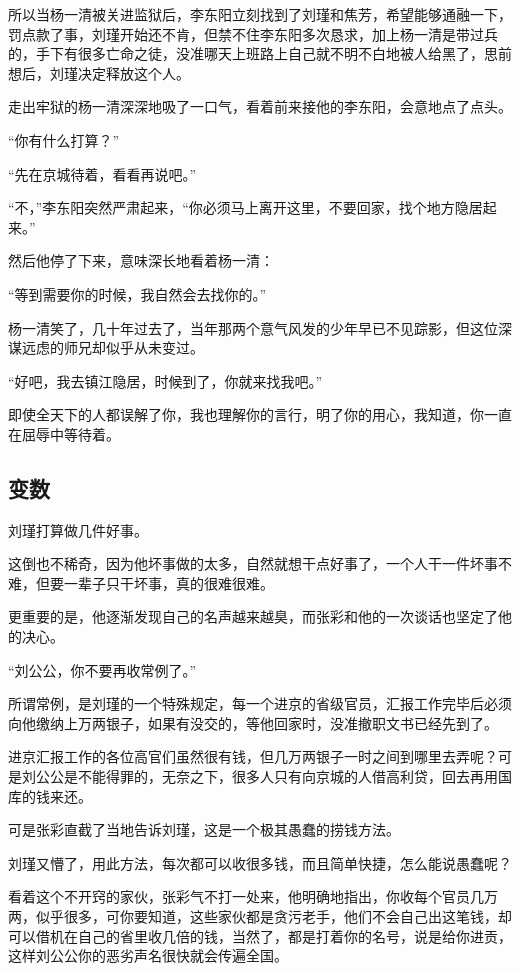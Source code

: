 \begin{multicols}{\theparacolNo}
		所以当杨一清被关进监狱后，李东阳立刻找到了刘瑾和焦芳，希望能够通融一下，罚点款了事，刘瑾开始还不肯，但禁不住李东阳多次恳求，加上杨一清是带过兵的，手下有很多亡命之徒，没准哪天上班路上自己就不明不白地被人给黑了，思前想后，刘瑾决定释放这个人。

		走出牢狱的杨一清深深地吸了一口气，看着前来接他的李东阳，会意地点了点头。

		“你有什么打算？”

		“先在京城待着，看看再说吧。”

		“不，”李东阳突然严肃起来，“你必须马上离开这里，不要回家，找个地方隐居起来。”

		然后他停了下来，意味深长地看着杨一清：

		“等到需要你的时候，我自然会去找你的。”

		杨一清笑了，几十年过去了，当年那两个意气风发的少年早已不见踪影，但这位深谋远虑的师兄却似乎从未变过。

		“好吧，我去镇江隐居，时候到了，你就来找我吧。”

		即使全天下的人都误解了你，我也理解你的言行，明了你的用心，我知道，你一直在屈辱中等待着。

		\subsection{变数}
		刘瑾打算做几件好事。

		这倒也不稀奇，因为他坏事做的太多，自然就想干点好事了，一个人干一件坏事不难，但要一辈子只干坏事，真的很难很难。

		更重要的是，他逐渐发现自己的名声越来越臭，而张彩和他的一次谈话也坚定了他的决心。

		“刘公公，你不要再收常例了。”

		所谓常例，是刘瑾的一个特殊规定，每一个进京的省级官员，汇报工作完毕后必须向他缴纳上万两银子，如果有没交的，等他回家时，没准撤职文书已经先到了。

		进京汇报工作的各位高官们虽然很有钱，但几万两银子一时之间到哪里去弄呢？可是刘公公是不能得罪的，无奈之下，很多人只有向京城的人借高利贷，回去再用国库的钱来还。

		可是张彩直截了当地告诉刘瑾，这是一个极其愚蠢的捞钱方法。

		刘瑾又懵了，用此方法，每次都可以收很多钱，而且简单快捷，怎么能说愚蠢呢？

		看着这个不开窍的家伙，张彩气不打一处来，他明确地指出，你收每个官员几万两，似乎很多，可你要知道，这些家伙都是贪污老手，他们不会自己出这笔钱，却可以借机在自己的省里收几倍的钱，当然了，都是打着你的名号，说是给你进贡，这样刘公公你的恶劣声名很快就会传遍全国。


\end{multicols}
